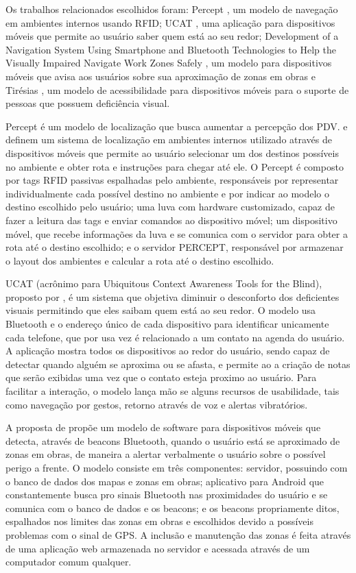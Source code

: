 \documentclass[twoside,english,brazilian]{UNISINOSartigo}
\begin{document}
Os trabalhos relacionados escolhidos foram: Percept \cite{Ganz2011, Ganz2012}, um modelo de navegação em ambientes internos usando RFID; UCAT \cite{ucat2014}, uma aplicação para dispositivos móveis que permite ao usuário saber quem está ao seu redor; Development of a Navigation System Using Smartphone and Bluetooth Technologies to Help the Visually Impaired Navigate Work Zones Safely \cite{chen2014}, um modelo para dispositivos móveis que avisa aos usuários sobre sua aproximação de zonas em obras e Tirésias \cite{Falk2013}, um modelo de acessibilidade para dispositivos móveis para o suporte de pessoas que possuem deficiência visual.

Percept é um modelo de localização que busca aumentar a percepção dos PDV.  e  definem um sistema de localização em ambientes internos utilizado através de dispositivos móveis que permite ao usuário selecionar um dos destinos possíveis no ambiente e obter rota e instruções para chegar até ele. O Percept é composto por tags RFID passivas espalhadas pelo ambiente, responsáveis por representar individualmente cada possível destino no ambiente e por indicar ao modelo o destino escolhido pelo usuário; uma luva com hardware customizado, capaz de fazer a leitura das tags e enviar comandos ao dispositivo móvel; um dispositivo móvel, que recebe informações da luva e se comunica com o servidor para obter a rota até o destino escolhido; e o servidor PERCEPT, responsável por armazenar o layout dos ambientes e calcular a rota até o destino escolhido.

UCAT (acrônimo para Ubiquitous Context Awareness Tools for the Blind), proposto por , é um sistema que objetiva diminuir o desconforto dos deficientes visuais permitindo que eles saibam quem está ao seu redor. O modelo usa Bluetooth e o endereço único de cada dispositivo para identificar unicamente cada telefone, que por usa vez é relacionado a um contato na agenda do usuário. A aplicação mostra todos os dispositivos ao redor do usuário, sendo capaz de detectar quando alguém se aproxima ou se afasta, e permite ao a criação de notas que serão exibidas uma vez que o contato esteja proximo ao usuário. Para facilitar a interação, o modelo lança mão se alguns recursos de usabilidade, tais como navegação por gestos, retorno através de voz e alertas vibratórios.

A proposta de  propõe um modelo de software para dispositivos móveis que detecta, através de beacons Bluetooth, quando o usuário está se aproximado de zonas em obras, de maneira a alertar verbalmente o usuário sobre o possível perigo a frente. O modelo consiste em três componentes: servidor, possuindo com o banco de dados dos mapas e zonas em obras; aplicativo para Android que constantemente busca pro sinais Bluetooth nas proximidades do usuário e se comunica com o banco de dados e os beacons; e os beacons propriamente ditos, espalhados nos limites das zonas em obras e escolhidos devido a possíveis problemas com o sinal de GPS. A inclusão e manutenção das zonas é feita através de uma aplicação web armazenada no servidor e acessada através de um computador comum qualquer.
\end{document}
